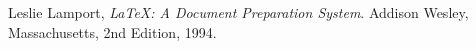 \documentclass{article}
\begin{document}
\begin{thebibliography}{9}
	  Leslie Lamport,
	  \emph{\LaTeX: A Document Preparation System}.
	  Addison Wesley, Massachusetts,
	  2nd Edition,
	  1994.

\end{thebibliography} %
\end{document}
